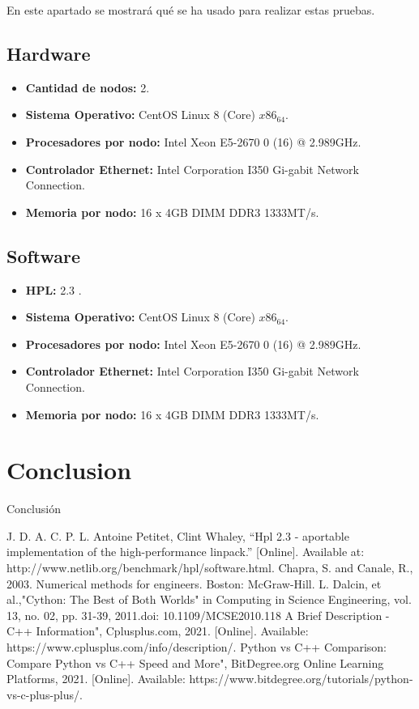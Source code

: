 \documentclass[conference]{IEEEtran}
\begin{document}
En este apartado se mostrará qué se ha usado para realizar estas pruebas.

\subsection{Hardware}

\begin{itemize}
    \item \textbf{Cantidad de nodos:} 2.
    \item \textbf{Sistema Operativo:} CentOS Linux 8 (Core) \(x86_64\).
    \item \textbf{Procesadores por nodo:} Intel Xeon E5-2670 0 (16) @ 2.989GHz.
    \item \textbf{Controlador Ethernet:} Intel Corporation I350 Gi-gabit Network Connection.
    \item \textbf{Memoria por nodo:} 16 x 4GB DIMM DDR3 1333MT/s.
\end{itemize}

\subsection{Software}

\begin{itemize}
    \item \textbf{HPL:} 2.3 \cite{1}.
    \item \textbf{Sistema Operativo:} CentOS Linux 8 (Core) \(x86_64\).
    \item \textbf{Procesadores por nodo:} Intel Xeon E5-2670 0 (16) @ 2.989GHz.
    \item \textbf{Controlador Ethernet:} Intel Corporation I350 Gi-gabit Network Connection.
    \item \textbf{Memoria por nodo:} 16 x 4GB DIMM DDR3 1333MT/s.
\end{itemize}

\section{Conclusion}

Conclusión

\begin{thebibliography}{00}
 J. D. A. C. P. L. Antoine Petitet, Clint Whaley, “Hpl 2.3 - aportable implementation of the high-performance linpack.” [Online]. Available at: http://www.netlib.org/benchmark/hpl/software.html.
 Chapra, S. and Canale, R., 2003. Numerical methods for engineers. Boston: McGraw-Hill.
L. Dalcin, et al.,"Cython: The Best of Both Worlds" in Computing in Science  Engineering, vol. 13, no. 02, pp. 31-39, 2011.doi: 10.1109/MCSE2010.118
 A Brief Description - C++ Information", Cplusplus.com, 2021. [Online]. Available: https://www.cplusplus.com/info/description/.
 Python vs C++ Comparison: Compare Python vs C++ Speed and More", BitDegree.org Online Learning Platforms, 2021. [Online]. Available: https://www.bitdegree.org/tutorials/python-vs-c-plus-plus/.
\end{thebibliography}
\end{document}
